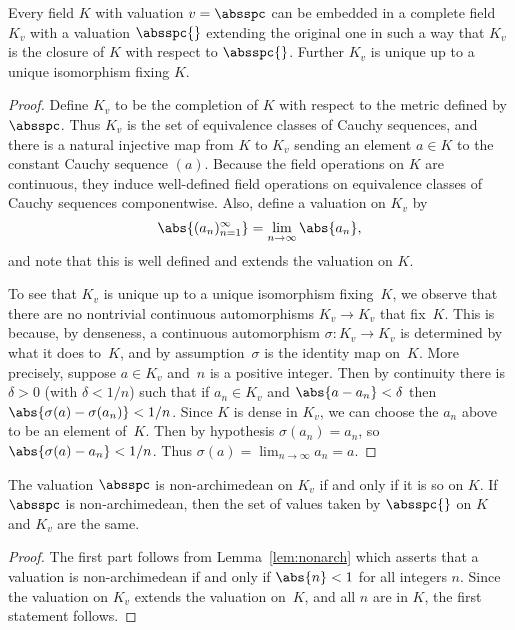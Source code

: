 \documentclass[11pt]{book}
\begin{document}
\begin{ch}
\begin{theorem}
Every field $K$ with valuation $v=\absspc$ can be
embedded in a complete field $K_v$ with a valuation $\absspc{}$
extending the original one in such a way that $K_v$ is the closure of
$K$ with respect to $\absspc{}$.  Further $K_v$ is unique up to
a unique isomorphism fixing $K$.
\end{theorem}
\begin{proof}
Define $K_v$ to be the completion of $K$ with respect to the metric
defined by $\absspc$.  Thus $K_v$ is the set of equivalence classes of
Cauchy sequences, and there is a natural injective map from $K$ to
$K_v$ sending an element $a\in K$ to the constant Cauchy sequence
$(a)$.  Because the field operations on $K$ are continuous, they
induce well-defined field operations on equivalence classes of Cauchy
sequences componentwise.   Also, define a valuation on $K_v$ by
$$\abs{(a_n)_{n=1}^{\infty}} = \lim_{n\to\infty} \abs{a_n},$$ and note
that this is well defined and extends the valuation on $K$.

To see that $K_v$ is unique up to a unique isomorphism fixing~$K$, we
observe that there are no nontrivial continuous automorphisms $K_v\to
K_v$ that fix~$K$.  This is because, by denseness, a continuous
automorphism $\sigma: K_v\to K_v$ is determined by what it does
to~$K$, and by assumption~$\sigma$ is the identity map on~$K$.  More
precisely, suppose $a\in K_v$ and~$n$ is a positive integer.  Then by
continuity there is $\delta>0$ (with $\delta<1/n$) such that if
$a_n\in K_v$ and $\abs{a-a_n}<\delta$ then
$\abs{\sigma(a)-\sigma(a_n)}<1/n$.  Since $K$ is dense in $K_v$, we
can choose the $a_n$ above to be an element of~$K$.  Then by
hypothesis $\sigma(a_n)=a_n$, so $\abs{\sigma(a) - a_n} < 1/n$.  Thus
$\sigma(a) = \lim_{n\to\infty} a_n = a$.
\end{proof}

\begin{corollary}\label{cor:valna}
The valuation $\absspc$ is non-archimedean
on $K_v$ if and only if it is so on $K$.  If $\absspc$ is
non-archimedean, then the set of values taken by $\absspc{}$ on $K$
and $K_v$ are the same.
\end{corollary}
\begin{proof}
  The first part follows from Lemma~\ref{lem:nonarch} which asserts
  that a valuation is non-archimedean if and only if $\abs{n}<1$ for
  all integers $n$.  Since the valuation on $K_v$ extends the
  valuation on~$K$, and all $n$ are in $K$, the first statement
  follows.


\end{proof}
\end{ch}
\end{document}
